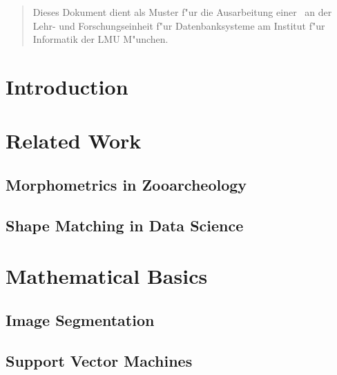 \documentclass[pdftex,12pt,a4paper]{report}
\begin{document}
\deckblatt

\erklaerung

\begin{abstract}
Dieses Dokument dient als Muster f"ur die Ausarbeitung einer \the\arbeit\
an der Lehr- und Forschungseinheit f"ur Datenbanksysteme am Institut f"ur
Informatik der LMU M"unchen.
\end{abstract}

\tableofcontents

\chapter{Introduction}

\chapter{Related Work}



\section{Morphometrics in Zooarcheology}

\cite{blackith1971multivariate}
\cite{adams2004geometric}
\cite{mitteroecker2009advances}

\section{Shape Matching in Data Science}

\cite{da2010shape}
\cite{veltkamp2001shape}
\cite{belongie2002shape}
\cite{mhamdi2014local}

\chapter{Mathematical Basics}

\section{Image Segmentation}

\cite{van2014scikit}

\section{Support Vector Machines}
\end{document}
